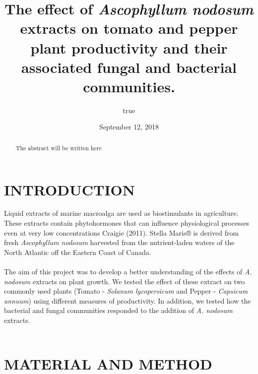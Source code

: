 \documentclass[11pt,]{article}
\title{\textbf{The effect of \emph{Ascophyllum nodosum} extracts on tomato and
pepper plant productivity and their associated fungal and bacterial
communities.}}
\author{true}
\date{September 12, 2018}
\begin{document}
\maketitle
\begin{abstract}
The abstract will be written here
\end{abstract}

\newpage 

\section{INTRODUCTION}\label{introduction}

Liquid extracts of marine macroalga are used as biostimulants in
agriculture. These extracts contain phytohormones that can influence
physiological processes even at very low concentrations Craigie (2011).
Stella Maris® is derived from fresh \emph{Ascophyllum nodosum} harvested
from the nutrient-laden waters of the North Atlantic off the Eastern
Coast of Canada.\\
\hspace*{0.333em}\\
The aim of this project was to develop a better understanding of the
effects of \emph{A. nodosum} extracts on plant growth. We tested the
effect of these extract on two commonly used plants (Tomato -
\emph{Solanum lycopersicum} and Pepper - \emph{Capsicum annuum}) using
different measures of productivity. In addition, we tested how the
bacterial and fungal communities responded to the addition of \emph{A.
nodosum} extracts.\\
\hspace*{0.333em} ~

\section{MATERIAL AND METHOD}\label{material-and-method}
\end{document}
